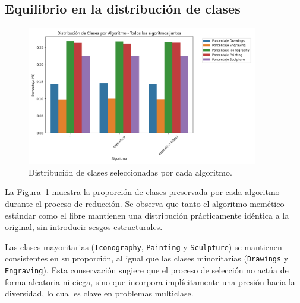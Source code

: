\subsection{Equilibrio en la distribución de clases}
\begin{figure}[htp]
    \centering
    \includegraphics[width=0.9\textwidth]{imagenes/evaluaciones/painting/balance-de-clases-por-algoritmo}
    \caption{Distribución de clases seleccionadas por cada algoritmo.}
    \label{fig:balance_clases_painting}
\end{figure}

La Figura~\ref{fig:balance_clases_painting} muestra la proporción de clases preservada por cada algoritmo durante el proceso de reducción.
Se observa que tanto el algoritmo memético estándar como el libre mantienen una distribución prácticamente idéntica a la original,
sin introducir sesgos estructurales.

Las clases mayoritarias (\texttt{Iconography}, \texttt{Painting} y \texttt{Sculpture}) se mantienen consistentes en su proporción,
al igual que las clases minoritarias (\texttt{Drawings} y \texttt{Engraving}).
Esta conservación sugiere que el proceso de selección no actúa de forma aleatoria ni ciega,
sino que incorpora implícitamente una presión hacia la diversidad, lo cual es clave en problemas multiclase.

